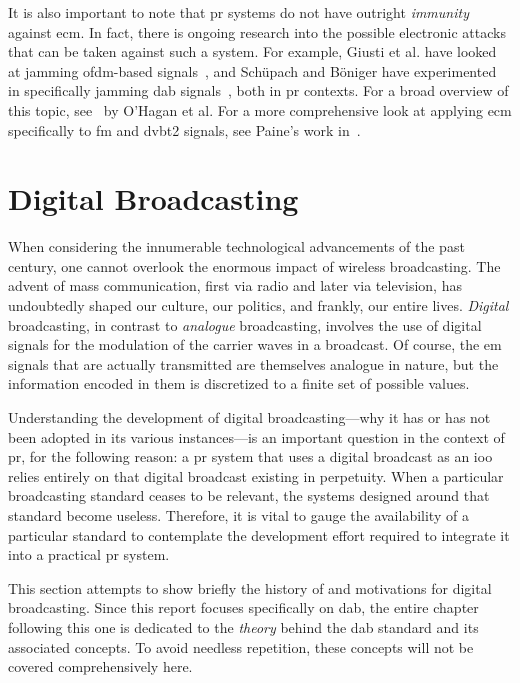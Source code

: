 \documentclass[class=report,11pt,crop=false]{standalone}
\begin{document}
It is also important to note that \gls{pr} systems do not have outright \emph{immunity} against \gls{ecm}. In fact, there is ongoing research into the possible electronic attacks that can be taken against such a system. For example, Giusti et al. have looked at jamming \gls{ofdm}-based signals~\cite{Giusti2018}, and Sch\"upach and B\"oniger have experimented in specifically jamming \gls{dab} signals~\cite{schupbach2016}, both in \gls{pr} contexts. For a broad overview of this topic, see~\cite{OHagan2019} by O'Hagan et al. For a more comprehensive look at applying \gls{ecm} specifically to \gls{fm} and \gls{dvbt2} signals, see Paine's work in~\cite{painePHD2019}.

\section{Digital Broadcasting}
When considering the innumerable technological advancements of the past century, one cannot overlook the enormous impact of wireless broadcasting. The advent of mass communication, first via radio and later via television, has undoubtedly shaped our culture, our politics, and frankly, our entire lives. \emph{Digital} broadcasting, in contrast to \emph{analogue} broadcasting, involves the use of digital signals for the modulation of the carrier waves in a broadcast. Of course, the \gls{em} signals that are actually transmitted are themselves analogue in nature, but the information encoded in them is discretized to a finite set of possible values.

Understanding the development of digital broadcasting---why it has or has not been adopted in its various instances---is an important question in the context of \gls{pr}, for the following reason: a \gls{pr} system that uses a digital broadcast as an \gls{ioo} relies entirely on that digital broadcast existing in perpetuity. When a particular broadcasting standard ceases to be relevant, the systems designed around that standard become useless. Therefore, it is vital to gauge the availability of a particular standard to contemplate the development effort required to integrate it into a practical \gls{pr} system.

This section attempts to show briefly the history of and motivations for digital broadcasting. Since this report focuses specifically on \gls{dab}, the entire chapter following this one is dedicated to the \emph{theory} behind the \gls{dab} standard and its associated concepts. To avoid needless repetition, these concepts will not be covered comprehensively here.
\end{document}
